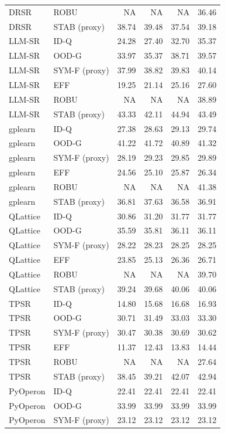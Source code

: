 \begin{tabular}{llrrrr}
DRSR & ROBU & NA & NA & NA & 36.46 \\
DRSR & STAB (proxy) & 38.74 & 39.48 & 37.54 & 39.18 \\
LLM-SR & ID-Q & 24.28 & 27.40 & 32.70 & 35.37 \\
LLM-SR & OOD-G & 33.97 & 35.37 & 38.71 & 39.57 \\
LLM-SR & SYM-F (proxy) & 37.99 & 38.82 & 39.83 & 40.14 \\
LLM-SR & EFF & 19.25 & 21.14 & 25.16 & 27.60 \\
LLM-SR & ROBU & NA & NA & NA & 38.89 \\
LLM-SR & STAB (proxy) & 43.33 & 42.11 & 44.94 & 43.49 \\
gplearn & ID-Q & 27.38 & 28.63 & 29.13 & 29.74 \\
gplearn & OOD-G & 41.22 & 41.72 & 40.89 & 41.32 \\
gplearn & SYM-F (proxy) & 28.19 & 29.23 & 29.85 & 29.89 \\
gplearn & EFF & 24.56 & 25.10 & 25.87 & 26.34 \\
gplearn & ROBU & NA & NA & NA & 41.38 \\
gplearn & STAB (proxy) & 36.81 & 37.63 & 36.58 & 36.91 \\
QLattice & ID-Q & 30.86 & 31.20 & 31.77 & 31.77 \\
QLattice & OOD-G & 35.59 & 35.81 & 36.11 & 36.11 \\
QLattice & SYM-F (proxy) & 28.22 & 28.23 & 28.25 & 28.25 \\
QLattice & EFF & 23.85 & 25.13 & 26.36 & 26.71 \\
QLattice & ROBU & NA & NA & NA & 39.70 \\
QLattice & STAB (proxy) & 39.24 & 39.68 & 40.06 & 40.06 \\
TPSR & ID-Q & 14.80 & 15.68 & 16.68 & 16.93 \\
TPSR & OOD-G & 30.71 & 31.49 & 33.03 & 33.30 \\
TPSR & SYM-F (proxy) & 30.47 & 30.38 & 30.69 & 30.62 \\
TPSR & EFF & 11.37 & 12.43 & 13.83 & 14.44 \\
TPSR & ROBU & NA & NA & NA & 27.64 \\
TPSR & STAB (proxy) & 38.45 & 39.21 & 42.07 & 42.94 \\
PyOperon & ID-Q & 22.41 & 22.41 & 22.41 & 22.41 \\
PyOperon & OOD-G & 33.99 & 33.99 & 33.99 & 33.99 \\
PyOperon & SYM-F (proxy) & 23.12 & 23.12 & 23.12 & 23.12 \\

\end{tabular}
